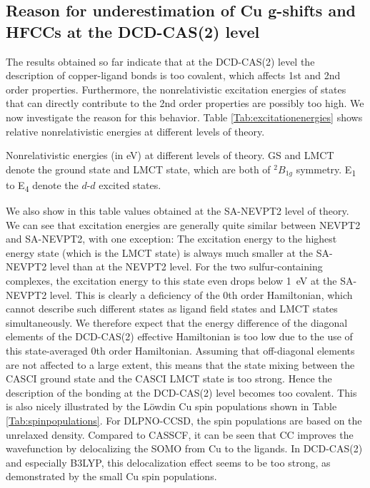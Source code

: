 \subsection{Reason for underestimation of Cu g-shifts and HFCCs at the DCD-CAS(2) level}
\label{Sec:reasons_underestimation}
The results obtained so far indicate that at the DCD-CAS(2) level the description of copper-ligand bonds is too covalent, which affects 1st and 2nd order properties. Furthermore, the nonrelativistic excitation energies of states that can directly contribute to the 2nd order properties are possibly too high. We now investigate the reason for this behavior. Table \ref{Tab:excitationenergies} shows relative nonrelativistic energies at different levels of theory.
\begin{table}
\small
\centering
\ttabbox
{\caption[Nonrelativistic energies at different levels of theory.]{Nonrelativistic energies (in eV) at different levels of theory. GS and LMCT denote the ground state and LMCT state, which are both of $^2B_{1g}$ symmetry. E\textsubscript{1} to E\textsubscript{4} denote the $d$-$d$ excited states.}
\label{Tab:excitationenergies}}
{}
\end{table}
We also show in this table values obtained at the SA-NEVPT2 level of theory. We can see that excitation energies are generally quite similar between NEVPT2 and SA-NEVPT2, with one exception: The excitation energy to the highest energy state (which is the LMCT state) is always much smaller at the SA-NEVPT2 level than at the NEVPT2 level. For the two sulfur-containing complexes, the excitation energy to this state even drops below 1~eV at the SA-NEVPT2 level. This is clearly a deficiency of the 0th order Hamiltonian, which cannot describe such different states as ligand field states and LMCT states simultaneously. We therefore expect that the energy difference of the diagonal elements of the DCD-CAS(2) effective Hamiltonian is too low due to the use of this state-averaged 0th order Hamiltonian. Assuming that off-diagonal elements are not affected to a large extent, this means that the state mixing between the CASCI ground state and the CASCI LMCT state is too strong. Hence the description of the bonding at the DCD-CAS(2) level becomes too covalent. This is also nicely illustrated by the Löwdin Cu spin populations shown in Table \ref{Tab:spinpopulations}. For DLPNO-CCSD, the spin populations are based on the unrelaxed density. Compared to CASSCF, it can be seen that CC improves the wavefunction by delocalizing the SOMO from Cu to the ligands. In DCD-CAS(2) and especially B3LYP, this delocalization effect seems to be too strong, as demonstrated by the small Cu spin populations.
